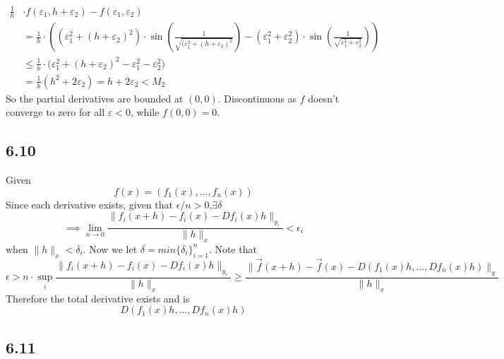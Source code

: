 \documentclass[letterpaper,12pt]{article}
\theoremstyle{definition}
\begin{document}
\begin{align*}
    \frac{1}{h} &\cdot f(\varepsilon_1, h+\varepsilon_2) - f(\varepsilon_1, \varepsilon_2)\\
    &= \frac{1}{h} \cdot \left( ( \varepsilon_1^2 + (h+\varepsilon_2)^2)\cdot \sin\left(\frac{1}{\sqrt{(\varepsilon_1^2 + (h+\varepsilon_2)^2}}\right) - (\varepsilon_1^2 + \varepsilon_2^2)\cdot \sin\left(\frac{1}{\sqrt{\varepsilon_1^2 + \varepsilon_2^2}}\right) \right) \\
    & \leq \frac{1}{h} \cdot \big( \varepsilon_1^2 + (h+\varepsilon_2)^2 - \varepsilon_1^2 - \varepsilon_2^2 \big) \\
    &= \frac{1}{h}(h^2 +2\varepsilon_2) = h + 2\varepsilon_2 < M_2
\end{align*}
So the partial derivatives are bounded at $(0,0)$. Discontinuous as $f$ doesn't converge to zero for all $\varepsilon < 0$, while $f(0,0) = 0$.


\subsection*{6.10}
Given
\[f(x) = (f_1(x),...,f_n(x))\]
Since each derivative exists, given that $\epsilon / n >0$,$\exists \delta$ 
\[\implies  \lim_{n \to 0} \frac{\| f_i(x+h) - f_i(x) - Df_i(x)h\|_{y_i}}{\|h\|_x}<\epsilon_i\]
when $\|h\|_x < \delta_i$. Now we let $\delta = min\{\delta_i\}_{i=1}^n$. Note that
\[\epsilon > n\cdot \sup_i \frac{\| f_i(x+h) - f_i(x) - Df_i(x)h\|_{y_i}}{\|h\|_x}\geq \frac{\| \vec{f}(x+h) - \vec{f}(x) - D(f_1(x)h,...,Df_n(x)h)\|_{y}}{\|h\|_x} \]
Therefore the total derivative exists and is 
\[D(f_1(x)h,...,Df_n(x)h)\]







\subsection*{6.11}
\end{document}
